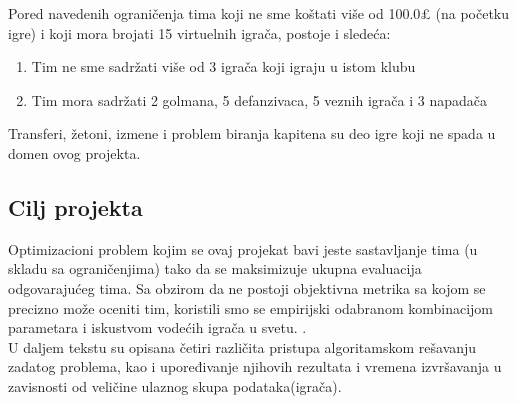 \documentclass[a4paper]{article}
\begin{document}
Pored navedenih ograničenja tima koji ne sme koštati više od 100.0£ (na početku igre) i koji mora brojati 15 virtuelnih igrača, postoje i sledeća:
\begin{enumerate}
  \item Tim ne sme sadržati više od 3 igrača koji igraju u istom klubu
  \item Tim mora sadržati 2 golmana, 5 defanzivaca, 5 veznih igrača i 3 napadača
\end{enumerate} 
\vspace{5mm} %
Transferi, žetoni, izmene i problem biranja kapitena su deo igre koji ne spada u domen ovog projekta.



\subsection{Cilj projekta}
\vspace{3mm}
Optimizacioni problem kojim se ovaj projekat bavi jeste sastavljanje tima (u skladu sa ograničenjima) tako da se maksimizuje ukupna evaluacija odgovarajućeg tima. Sa obzirom da ne postoji objektivna metrika sa kojom se precizno može oceniti tim, koristili smo se empirijski odabranom kombinacijom parametara i iskustvom vodećih igrača u svetu.  \cite{FPLExpert}. \\

U daljem tekstu su opisana četiri različita pristupa algoritamskom rešavanju zadatog problema, kao i upoređivanje njihovih rezultata i vremena izvršavanja u zavisnosti od veličine ulaznog skupa podataka(igrača).

\vspace{5mm} 





\end{document}
